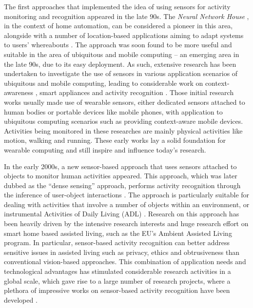 The first approaches that implemented the idea of using sensors for activity monitoring and recognition appeared in the late 90s. The \textit{Neural Network House} \cite{Mozer1998}, in the context of home automation, can be considered a pioneer in this area, alongside with a number of location-based applications aiming to adapt systems to users’ whereabouts \cite{Leonhardt1998} \cite{Golding1999} \cite{Ward1997}. The approach was soon found to be more useful and suitable in the area of ubiquitous and mobile computing – an emerging area in the late 90s, due to its easy deployment. As such, extensive research has been undertaken to investigate the use of sensors in various application scenarios of ubiquitous and mobile computing, leading to considerable work on context-awareness \cite{Schmidt1999} \cite{Randell2000} \cite{Gellersen2002}, smart appliances \cite{Schmidt2001} \cite{Laerhoven2001} and activity recognition \cite{Laerhoven2001a} \cite{Foerster2000} \cite{Lee2002}. Those initial research works usually made use of wearable sensors, either dedicated sensors attached to human bodies or portable devices like mobile phones, with application to ubiquitous computing scenarios such as providing context-aware mobile devices. Activities being monitored in these researches are mainly physical activities like motion, walking and running. These early works lay a solid foundation for wearable computing and still inspire and influence today’s research.

In the early 2000s, a new sensor-based approach that uses sensors attached to objects to monitor human activities appeared. This approach, which was later dubbed as the “dense sensing” approach, performs activity recognition through the inference of user-object interactions \cite{Bao2004} \cite{Patterson2003}. The approach is particularly suitable for dealing with activities that involve a number of objects within an environment, or instrumental Activities of Daily Living (ADL) \cite{Chan2008} \cite{Nugent2009}. Research on this approach has been heavily driven by the intensive research interests and huge research effort on smart home based assisted living, such as the EU’s Ambient Assisted Living program. In particular, sensor-based activity recognition can better address sensitive issues in assisted living such as privacy, ethics and obtrusiveness than conventional vision-based approaches. This combination of application needs and technological advantages has stimulated considerable research activities in a global scale, which gave rise to a large number of research projects, where a plethora of impressive works on sensor-based activity recognition have been developed \cite{Kern2003}  \cite{Mantyjarvi2001} \cite{Philipose2004} \cite{Patterson2005} \cite{Buettner2009} \cite{Wren2006} \cite{Gu2009} \cite{Patterson2003} \cite{Liao2007}.


